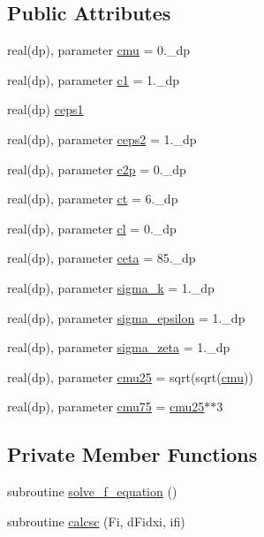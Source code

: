 \subsection*{Public Attributes}
\begin{DoxyCompactItemize}
\item 
real(dp), parameter \hyperlink{classk__epsilon__zeta__f_a5d567a6368bca5b0841051cd221355d4}{cmu} = 0.\-\_\-dp
\item 
real(dp), parameter \hyperlink{classk__epsilon__zeta__f_a45bedddf115b58d59169d1da64d873eb}{c1} = 1.\-\_\-dp
\item 
real(dp) \hyperlink{classk__epsilon__zeta__f_a424dc1473dde87fac65394097c5a045f}{ceps1}
\item 
real(dp), parameter \hyperlink{classk__epsilon__zeta__f_a9ebcc0eb612e02b54b59ef242fb0c21c}{ceps2} = 1.\-\_\-dp
\item 
real(dp), parameter \hyperlink{classk__epsilon__zeta__f_af3e889088961660782f1a7e4406edee3}{c2p} = 0.\-\_\-dp
\item 
real(dp), parameter \hyperlink{classk__epsilon__zeta__f_a54620cbb76d5c8b3260c4f8037170965}{ct} = 6.\-\_\-dp
\item 
real(dp), parameter \hyperlink{classk__epsilon__zeta__f_a40a3b2a1b969e48ceb6fdd23b6372ef9}{cl} = 0.\-\_\-dp
\item 
real(dp), parameter \hyperlink{classk__epsilon__zeta__f_a93538d3314d49ba78d1b3ee314805659}{ceta} = 85.\-\_\-dp
\item 
real(dp), parameter \hyperlink{classk__epsilon__zeta__f_af3d1153ca4d94b086f0798fbd5f42e69}{sigma\-\_\-k} = 1.\-\_\-dp
\item 
real(dp), parameter \hyperlink{classk__epsilon__zeta__f_a652a1e9afd57b34e9f0d9c477d6ea1bd}{sigma\-\_\-epsilon} = 1.\-\_\-dp
\item 
real(dp), parameter \hyperlink{classk__epsilon__zeta__f_a2e51be2b8f0a253169c6cae4be84d58d}{sigma\-\_\-zeta} = 1.\-\_\-dp
\item 
real(dp), parameter \hyperlink{classk__epsilon__zeta__f_a308cd7b6a2275f11124688a6adf889f4}{cmu25} = sqrt(sqrt(\hyperlink{classk__epsilon__zeta__f_a5d567a6368bca5b0841051cd221355d4}{cmu}))
\item 
real(dp), parameter \hyperlink{classk__epsilon__zeta__f_a131abf270c04c30fb509cfeb44b84083}{cmu75} = \hyperlink{classk__epsilon__zeta__f_a308cd7b6a2275f11124688a6adf889f4}{cmu25}$\ast$$\ast$3
\end{DoxyCompactItemize}
\subsection*{Private Member Functions}
\begin{DoxyCompactItemize}
\item 
subroutine \hyperlink{classk__epsilon__zeta__f_af14b2ab1d31025e38c2f7c0c03144e0c}{solve\-\_\-f\-\_\-equation} ()
\item 
subroutine \hyperlink{classk__epsilon__zeta__f_a40c6034a8de0d37467f8b44a6a56c9f4}{calcsc} (Fi, d\-Fidxi, ifi)
\end{DoxyCompactItemize}


